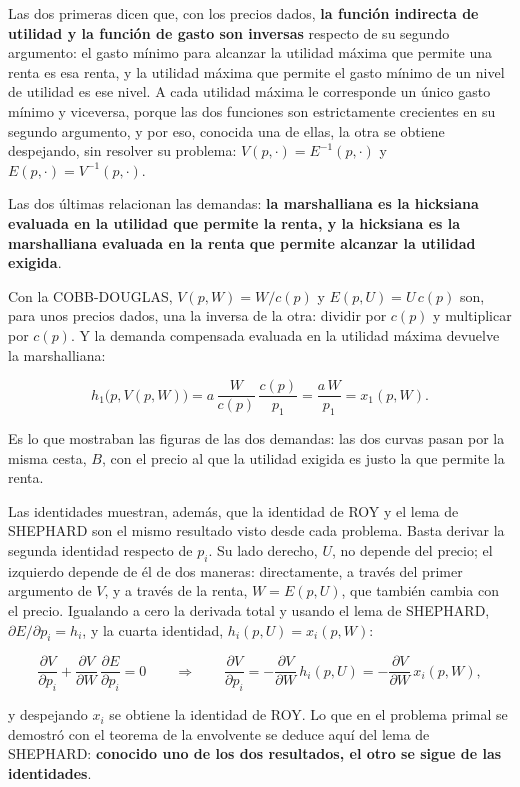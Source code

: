 \documentclass[10pt,a4paper]{article}
\begin{document}
Las dos primeras dicen que, con los precios dados, \textbf{la función indirecta de utilidad y la función de gasto son inversas} respecto de su segundo argumento: el gasto mínimo para alcanzar la utilidad máxima que permite una renta es esa renta, y la utilidad máxima que permite el gasto mínimo de un nivel de utilidad es ese nivel. A cada utilidad máxima le corresponde un único gasto mínimo y viceversa, porque las dos funciones son estrictamente crecientes en su segundo argumento, y por eso, conocida una de ellas, la otra se obtiene despejando, sin resolver su problema: $V(p,\cdot)=E^{-1}(p,\cdot)$ y $E(p,\cdot)=V^{-1}(p,\cdot)$.

Las dos últimas relacionan las demandas: \textbf{la marshalliana es la hicksiana evaluada en la utilidad que permite la renta, y la hicksiana es la marshalliana evaluada en la renta que permite alcanzar la utilidad exigida}.

Con la COBB-DOUGLAS, $V(p,W)=W/c(p)$ y $E(p,U)=U\,c(p)$ son, para unos precios dados, una la inversa de la otra: dividir por $c(p)$ y multiplicar por $c(p)$. Y la demanda compensada evaluada en la utilidad máxima devuelve la marshalliana:

$$h_1\big(p,V(p,W)\big)=a\,\frac{W}{c(p)}\,\frac{c(p)}{p_1}=\frac{a\,W}{p_1}=x_1(p,W).$$

Es lo que mostraban las figuras de las dos demandas: las dos curvas pasan por la misma cesta, $B$, con el precio al que la utilidad exigida es justo la que permite la renta.

Las identidades muestran, además, que la identidad de ROY y el lema de SHEPHARD son el mismo resultado visto desde cada problema. Basta derivar la segunda identidad respecto de $p_i$. Su lado derecho, $U$, no depende del precio; el izquierdo depende de él de dos maneras: directamente, a través del primer argumento de $V$, y a través de la renta, $W=E(p,U)$, que también cambia con el precio. Igualando a cero la derivada total y usando el lema de SHEPHARD, $\partial E/\partial p_i=h_i$, y la cuarta identidad, $h_i(p,U)=x_i(p,W)$:

$$\frac{\partial V}{\partial p_i}+\frac{\partial V}{\partial W}\,\frac{\partial E}{\partial p_i}=0\qquad\Longrightarrow\qquad \frac{\partial V}{\partial p_i}=-\frac{\partial V}{\partial W}\,h_i(p,U)=-\frac{\partial V}{\partial W}\,x_i(p,W),$$

y despejando $x_i$ se obtiene la identidad de ROY. Lo que en el problema primal se demostró con el teorema de la envolvente se deduce aquí del lema de SHEPHARD: \textbf{conocido uno de los dos resultados, el otro se sigue de las identidades}.
\end{document}
